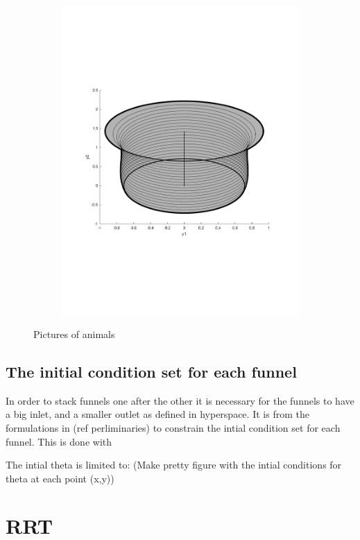 \begin{figure}
\begin{subfigure}[b]{0.3\textwidth}
        \includegraphics[width=\textwidth]{figures/experiments/FunnelSOS1}
        \label{fig:tiger}
    \end{subfigure}
    \caption{Pictures of animals}
\end{figure}

\subsection{The initial condition set for each funnel}

In order to stack funnels one after the other it is necessary for the funnels to
have a big inlet, and a smaller outlet as defined in hyperspace. It is from the
formulations in (ref perliminaries) to constrain the intial condition set for
each funnel. This is done with

The intial theta is limited to: (Make pretty figure with the intial conditions
for theta at each point (x,y))

\section{RRT}

